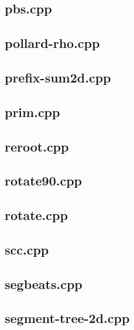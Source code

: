 \documentclass[a4paper,12pt]{article}
\begin{document}
\subsection{pbs.cpp}


\subsection{pollard-rho.cpp}


\subsection{prefix-sum2d.cpp}


\subsection{prim.cpp}


\subsection{reroot.cpp}


\subsection{rotate90.cpp}


\subsection{rotate.cpp}


\subsection{scc.cpp}


\subsection{segbeats.cpp}


\subsection{segment-tree-2d.cpp}

\end{document}

